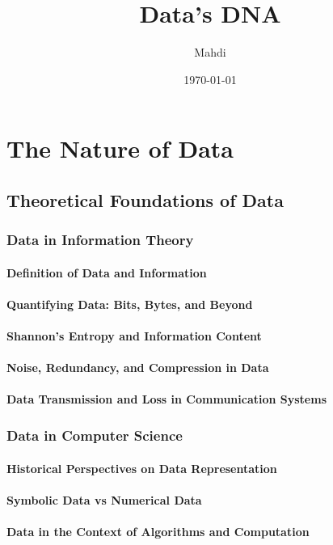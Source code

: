 \documentclass[12pt, oneside]{book}
\title{{\Huge Data's DNA}}
\author{{\LARGE Mahdi}}
\date{{\large \today}}
\begin{document}
	\frontmatter
	\mainmatter
	\maketitle
	\tableofcontents


\chapter{The Nature of Data}
\section{Theoretical Foundations of Data}
\subsection{Data in Information Theory}
\subsubsection{Definition of Data and Information}
\subsubsection{Quantifying Data: Bits, Bytes, and Beyond}
\subsubsection{Shannon's Entropy and Information Content}
\subsubsection{Noise, Redundancy, and Compression in Data}
\subsubsection{Data Transmission and Loss in Communication Systems}
\subsection{Data in Computer Science}
\subsubsection{Historical Perspectives on Data Representation}
\subsubsection{Symbolic Data vs Numerical Data}
\subsubsection{Data in the Context of Algorithms and Computation}
\end{document}
